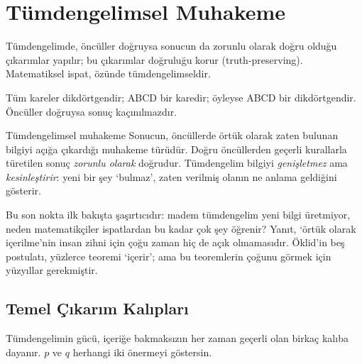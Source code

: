 \section{Tümdengelimsel Muhakeme}\label{sec:tumdengelim}

Tümdengelimde, öncüller doğruysa sonucun da zorunlu olarak doğru olduğu çıkarımlar yapılır; bu çıkarımlar doğruluğu korur (truth-preserving). Matematiksel ispat, özünde tümdengelimseldir.

\begin{ornek}
Tüm kareler dikdörtgendir; ABCD bir karedir; öyleyse ABCD bir dikdörtgendir. Öncüller doğruysa sonuç kaçınılmazdır.
\end{ornek}

\begin{tanim}{Tümdengelimsel muhakeme}
Sonucun, öncüllerde örtük olarak zaten bulunan bilgiyi açığa çıkardığı muhakeme türüdür. Doğru öncüllerden geçerli kurallarla türetilen sonuç \emph{zorunlu olarak} doğrudur. Tümdengelim bilgiyi \emph{genişletmez} ama \emph{kesinleştirir}: yeni bir şey ‘bulmaz’, zaten verilmiş olanın ne anlama geldiğini gösterir.
\end{tanim}

Bu son nokta ilk bakışta şaşırtıcıdır: madem tümdengelim yeni bilgi üretmiyor, neden matematikçiler ispatlardan bu kadar çok şey öğrenir? Yanıt, ‘örtük olarak içerilme’nin insan zihni için çoğu zaman hiç de açık olmamasıdır. Öklid’in beş postulatı, yüzlerce teoremi ‘içerir’; ama bu teoremlerin çoğunu görmek için yüzyıllar gerekmiştir.

\subsection{Temel Çıkarım Kalıpları}

Tümdengelimin gücü, içeriğe bakmaksızın her zaman geçerli olan birkaç kalıba dayanır. $p$ ve $q$ herhangi iki önermeyi göstersin.

